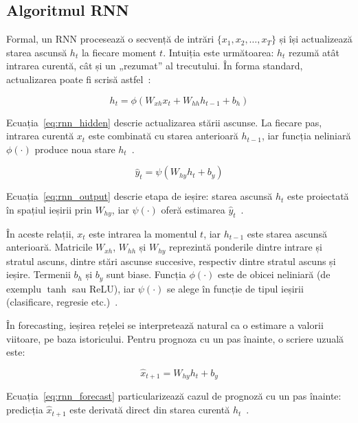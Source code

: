 \subsection{Algoritmul RNN}

Formal, un RNN procesează o secvență de intrări $\{x_1, x_2, \dots, x_T\}$ și își actualizează starea ascunsă $h_t$ la fiecare moment $t$. Intuiția este următoarea: $h_t$ rezumă atât intrarea curentă, cât și un „rezumat” al trecutului. În forma standard, actualizarea poate fi scrisă astfel~\cite{sherstinsky2020rnn}:

\begin{equation}
h_t = \phi \left( W_{xh} x_t + W_{hh} h_{t-1} + b_h \right)
\label{eq:rnn_hidden}
\end{equation}

Ecuația~\ref{eq:rnn_hidden} descrie actualizarea stării ascunse. La fiecare pas, intrarea curentă $x_t$ este combinată cu starea anterioară $h_{t-1}$, iar funcția neliniară $\phi(\cdot)$ produce noua stare $h_t$~\cite{sherstinsky2020rnn}.

\begin{equation}
\hat{y}_t = \psi \left( W_{hy} h_t + b_y \right)
\label{eq:rnn_output}
\end{equation}

Ecuația~\ref{eq:rnn_output} descrie etapa de ieșire: starea ascunsă $h_t$ este proiectată în spațiul ieșirii prin $W_{hy}$, iar $\psi(\cdot)$ oferă estimarea $\hat{y}_t$~\cite{sherstinsky2020rnn}.

În aceste relații, $x_t$ este intrarea la momentul $t$, iar $h_{t-1}$ este starea ascunsă anterioară. Matricile $W_{xh}$, $W_{hh}$ și $W_{hy}$ reprezintă ponderile dintre intrare și stratul ascuns, dintre stări ascunse succesive, respectiv dintre stratul ascuns și ieșire. Termenii $b_h$ și $b_y$ sunt biase. Funcția $\phi(\cdot)$ este de obicei neliniară (de exemplu $\tanh$ sau ReLU), iar $\psi(\cdot)$ se alege în funcție de tipul ieșirii (clasificare, regresie etc.)~\cite{sherstinsky2020rnn}.

În forecasting, ieșirea rețelei se interpretează natural ca o estimare a valorii viitoare, pe baza istoricului. Pentru prognoza cu un pas înainte, o scriere uzuală este:

\begin{equation}
\hat{x}_{t+1} = W_{hy} h_t + b_y
\label{eq:rnn_forecast}
\end{equation}

Ecuația~\ref{eq:rnn_forecast} particularizează cazul de prognoză cu un pas înainte: predicția $\hat{x}_{t+1}$ este derivată direct din starea curentă $h_t$~\cite{sherstinsky2020rnn}.

